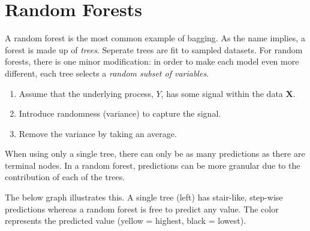 \documentclass[]{book}
\providecommand{\tightlist}{%
  \setlength{\itemsep}{0pt}\setlength{\parskip}{0pt}}
\begin{document}
\hypertarget{random-forests}{%
\section{Random Forests}\label{random-forests}}

A random forest is the most common example of bagging. As the name implies, a forest is made up of \emph{trees}. Seperate trees are fit to sampled datasets. For random forests, there is one minor modification: in order to make each model even more different, each tree selects a \emph{random subset of variables}.

\begin{enumerate}
\def\labelenumi{\arabic{enumi}.}
\tightlist
\item
  Assume that the underlying process, \(Y\), has some signal within the data \(\mathbf{X}\).
\item
  Introduce randomness (variance) to capture the signal.
\item
  Remove the variance by taking an average.
\end{enumerate}

When using only a single tree, there can only be as many predictions as there are terminal nodes. In a random forest, predictions can be more granular due to the contribution of each of the trees.

The below graph illustrates this. A single tree (left) has stair-like, step-wise predictions whereas a random forest is free to predict any value. The color represents the predicted value (yellow = highest, black = lowest).
\end{document}
